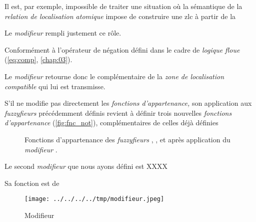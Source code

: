 Il est, par exemple, impossible de traiter une situation où la
sémantique de la \emph{relation de localisation atomique} impose de
construire une \ac{zlc} à partir de la 

Le \emph{modifieur}  rempli justement ce rôle.

Conformément à l'opérateur de négation défini dans le cadre de
\emph{logique floue} (\autoref{eq:comp}, \autoref{chap:03}).

Le \emph{modifieur}  retourne donc le complémentaire de
la \emph{zone de localisation compatible} qui lui est transmisse.

S'il ne modifie pas directement les \emph{fonctions d'appartenance,}
son application aux \emph{fuzzyfieurs} précédemment définis revient à
définir trois nouvelles \emph{fonctions d'appartenance}
(\autoref{fig:fnc_not}), complémentaires de celles déjà définies

\begin{figure}
  \centering
  
  \hfill  
  \caption{Fonctions d'appartenance des \emph{fuzzyfieurs}
    \protect{}, \protect{}, et
    \protect{} après application du \emph{modifieur}
    \protect{}.}
  \label{fig:fnc_not}
\end{figure}

Le second \emph{modifieur} que nous ayons défini est XXXX

Sa fonction est de 

\begin{figure}
  \centering
  \texttt{[image: ../../../../tmp/modifieur.jpeg]}
  \caption{Modifieur}
  \label{fig:methode_modifieur}
\end{figure}


